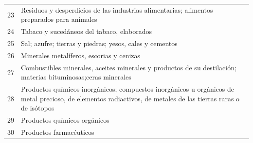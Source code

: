 \documentclass[a4paper,openright,12pt]{book}
\begin{document}
\begin{table}[]
{\begin{tabular}{@{}ll@{}}
    23  & Residuos y desperdicios de las industrias alimentarias; alimentos preparados para animales                                                                                                                                                                                                     \\
    24  & Tabaco y sucedáneos del tabaco, elaborados                                                                                                                                                                                                                                                     \\
    25  & Sal; azufre; tierras y piedras; yesos, cales y cementos                                                                                                                                                                                                                                        \\
    26  & Minerales metalíferos, escorias y cenizas                                                                                                                                                                                                                                                      \\
    27  & Combustibles minerales, aceites minerales y productos de su destilación; materias bituminosas;ceras minerales                                                                                                                                                                                  \\
    28  & Productos químicos inorgánicos; compuestos inorgánicos u orgánicos de metal precioso, de elementos radiactivos, de metales de las tierras raras o de isótopos                                                                                                                                  \\
    29  & Productos químicos orgánicos                                                                                                                                                                                                                                                                   \\
    30  & Productos farmacéuticos                                                                                                                                                                                                                                                                        \\

\end{tabular}}
\end{table}
\end{document}
